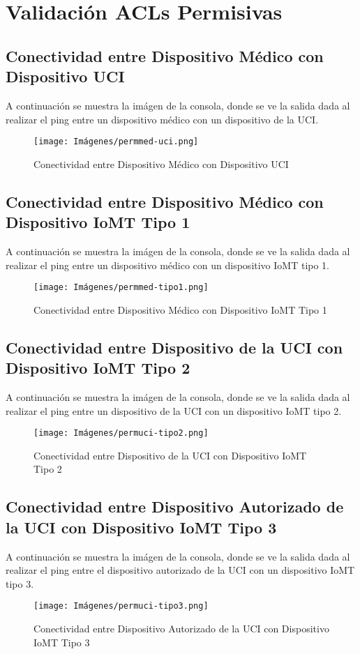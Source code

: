 \section{Validación ACLs Permisivas}
\subsection{Conectividad entre Dispositivo Médico con Dispositivo UCI}\label{anexo:permmed-uci}
A continuación se muestra la imágen de la consola, donde se ve la salida dada al realizar el ping entre un dispositivo médico con un dispositivo de la UCI.
\begin{figure}[H]
    \centering
    \texttt{[image: Imágenes/permmed-uci.png]}
    \caption{Conectividad entre Dispositivo Médico con Dispositivo UCI}
\end{figure}
\subsection{Conectividad entre Dispositivo Médico con Dispositivo IoMT Tipo 1}\label{anexo:permmed-tipo1}
A continuación se muestra la imágen de la consola, donde se ve la salida dada al realizar el ping entre un dispositivo médico con un dispositivo IoMT tipo 1.
\begin{figure}[H]
    \centering
    \texttt{[image: Imágenes/permmed-tipo1.png]}
    \caption{Conectividad entre Dispositivo Médico con Dispositivo IoMT Tipo 1}
\end{figure}
\subsection{Conectividad entre Dispositivo de la UCI con Dispositivo IoMT Tipo 2}\label{anexo:permuci-tipo2}
A continuación se muestra la imágen de la consola, donde se ve la salida dada al realizar el ping entre un dispositivo de la UCI con un dispositivo IoMT tipo 2.
\begin{figure}[H]
    \centering
    \texttt{[image: Imágenes/permuci-tipo2.png]}
    \caption{Conectividad entre Dispositivo de la UCI con Dispositivo IoMT Tipo 2}
\end{figure}
\subsection{Conectividad entre Dispositivo Autorizado de la UCI con Dispositivo IoMT Tipo 3}\label{anexo:permuci-tipo3}
A continuación se muestra la imágen de la consola, donde se ve la salida dada al realizar el ping entre el dispositivo autorizado de la UCI con un dispositivo IoMT tipo 3.
\begin{figure}[H]
    \centering
    \texttt{[image: Imágenes/permuci-tipo3.png]}
    \caption{Conectividad entre Dispositivo Autorizado de la UCI con Dispositivo IoMT Tipo 3}
\end{figure}

